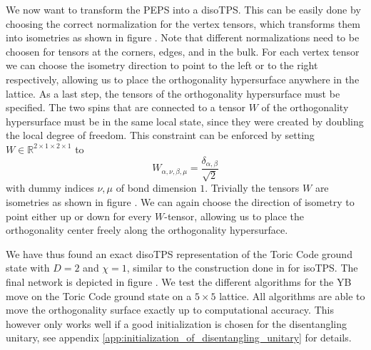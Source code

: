 We now want to transform the PEPS into a disoTPS. This can be easily done by choosing the correct normalization for the vertex tensors, which transforms them into isometries as shown in figure . Note that different normalizations need to be choosen for tensors at the corners, edges, and in the bulk. For each vertex tensor we can choose the isometry direction to point to the left or to the right respectively, allowing us to place the orthogonality hypersurface anywhere in the lattice. As a last step, the tensors of the orthogonality hypersurface must be specified. The two spins that are connected to a tensor $W$ of the orthogonality hypersurface must be in the same local state, since they were created by doubling the local degree of freedom. This constraint can be enforced by setting $W\in\mathbb{R}^{2\times1\times2\times1}$ to
\begin{equation}
	W_{\alpha,\nu,\beta,\mu} = \frac{\delta_{\alpha,\beta}}{\sqrt{2}}
\end{equation} 
with dummy indices $\nu, \mu$ of bond dimension $1$. Trivially the tensors $W$ are isometries as shown in figure . We can again choose the direction of isometry to point either up or down for every $W$-tensor, allowing us to place the orthogonality center freely along the orthogonality hypersurface.\par
We have thus found an exact disoTPS representation of the Toric Code ground state with $D = 2$ and $\chi= 1$, similar to the construction done in \cite{cite:isometric_tensor_network_representation_of_string_net_liquids} for isoTPS. The final network is depicted in figure . We test the different algorithms for the YB move on the Toric Code ground state on a $5\times5$ lattice. All algorithms are able to move the orthogonality surface exactly up to computational accuracy. This however only works well if a good initialization is chosen for the disentangling unitary, see appendix \ref{app:initialization_of_disentangling_unitary} for details.